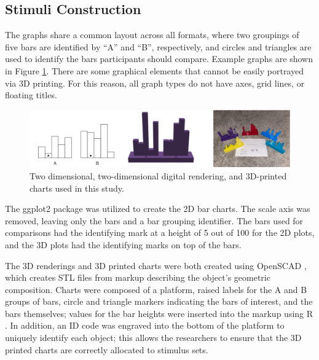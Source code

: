 \documentclass[letterpaper,inpress,dvipsnames]{jdsart}
\begin{document}
\hypertarget{stimuli-construction}{%
\subsection{Stimuli Construction}\label{stimuli-construction}}

The graphs share a common layout across all formats, where two groupings of five bars are identified by ``A'' and ``B'', respectively, and circles and triangles are used to identify the bars participants should compare. Example graphs are shown in
Figure \ref{fig:plotTypes}.
There are some graphical elements that cannot be easily portrayed via 3D printing. For this reason, all graph types do not have axes, grid lines, or floating titles.

\begin{figure}
\includegraphics[width=1\linewidth]{plot-types} \caption{Two dimensional, two-dimensional digital rendering, and 3D-printed charts used in this study.}\label{fig:plotTypes}
\end{figure}

The ggplot2 \citep{ggplot2} package was utilized to create the 2D bar charts.
The scale axis was removed, leaving only the bars and a bar grouping identifier.
The bars used for comparisons had the identifying mark at a height of 5 out of 100 for the 2D plots, and the 3D plots had the identifying marks on top of the bars.

The 3D renderings and 3D printed charts were both created using OpenSCAD \citep{kintelOpenSCADDocumentation2023}, which creates STL files from markup describing the object's geometric composition.
Charts were composed of a platform, raised labels for the A and B groups of bars, circle and triangle markers indicating the bars of interest, and the bars themselves; values for the bar heights were inserted into the markup using R \citep{R}.
In addition, an ID code was engraved into the bottom of the platform to uniquely identify each object; this allows the researchers to ensure that the 3D printed charts are correctly allocated to stimulus sets.
\end{document}
